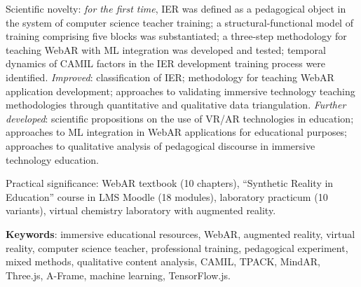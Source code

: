 Scientific novelty: \textit{for the first time}, IER was defined as a pedagogical object in the system of computer science teacher training; a structural-functional model of training comprising five blocks was substantiated; a three-step methodology for teaching WebAR with ML integration was developed and tested; temporal dynamics of CAMIL factors in the IER development training process were identified. \textit{Improved}: classification of IER; methodology for teaching WebAR application development; approaches to validating immersive technology teaching methodologies through quantitative and qualitative data triangulation. \textit{Further developed}: scientific propositions on the use of VR/AR technologies in education; approaches to ML integration in WebAR applications for educational purposes; approaches to qualitative analysis of pedagogical discourse in immersive technology education.

Practical significance: WebAR textbook (10 chapters), ``Synthetic Reality in Education'' course in LMS Moodle (18 modules), laboratory practicum (10 variants), virtual chemistry laboratory with augmented reality.

\textbf{Keywords}: immersive educational resources, WebAR, augmented reality, virtual reality, computer science teacher, professional training, pedagogical experiment, mixed methods, qualitative content analysis, CAMIL, TPACK, MindAR, Three.js, A-Frame, machine learning, TensorFlow.js.

\clearpage
\printpratsi{}
